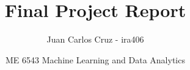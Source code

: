 \documentclass{article}
\title{Final Project Report}
\author{Juan Carlos Cruz - ira406}
\date{ME 6543 Machine Learning and Data Analytics}
\begin{document}
	\maketitle
	\noindent%

	
  	
	
	
	
	
	
	

	\newpage
	
	\nocite{*}
	
\end{document}
